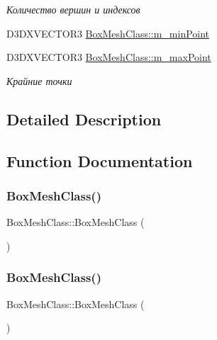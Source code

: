 \begin{DoxyCompactItemize}
\begin{DoxyCompactList}\small\item\em Количество вершин и индексов \end{DoxyCompactList}\item 
D3\+D\+X\+V\+E\+C\+T\+O\+R3 \hyperlink{group___meshes_ga01a788e0dd748680e15b4b23fee416f7}{Box\+Mesh\+Class\+::m\+\_\+min\+Point}
\item 
D3\+D\+X\+V\+E\+C\+T\+O\+R3 \hyperlink{group___meshes_ga30b105502d84acfeb2e709ef801726b5}{Box\+Mesh\+Class\+::m\+\_\+max\+Point}
\begin{DoxyCompactList}\small\item\em Крайние точки \end{DoxyCompactList}\end{DoxyCompactItemize}


\subsection{Detailed Description}


\subsection{Function Documentation}
\mbox{\label{group___meshes_gabc9d6020c66652ae6e3242ec85ae4663}} 
\subsubsection{\texorpdfstring{Box\+Mesh\+Class()}{BoxMeshClass()}\hspace{0.1cm}{\footnotesize\ttfamily [1/2]}}
{\footnotesize\ttfamily Box\+Mesh\+Class\+::\+Box\+Mesh\+Class (\begin{DoxyParamCaption}{ }\end{DoxyParamCaption})}

\mbox{\label{group___meshes_ga92cfbdfdf9c487040a8dab0f9a2974a1}} 
\subsubsection{\texorpdfstring{Box\+Mesh\+Class()}{BoxMeshClass()}\hspace{0.1cm}{\footnotesize\ttfamily [2/2]}}
{\footnotesize\ttfamily Box\+Mesh\+Class\+::\+Box\+Mesh\+Class (\begin{DoxyParamCaption}\item[{const \hyperlink{class_box_mesh_class}{Box\+Mesh\+Class} \&}]{ }\end{DoxyParamCaption})}

